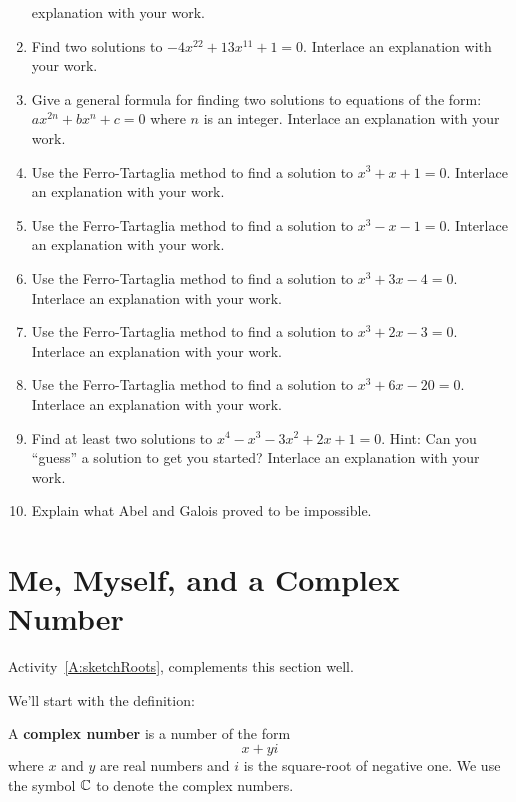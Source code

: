 \begin{problems}
\begin{enumerate}
  explanation with your work.
\item Find two solutions to $-4x^{22} + 13x^{11} + 1 = 0$. Interlace
  an explanation with your work.
\item Give a general formula for finding two solutions to equations of
  the form: $ax^{2n} + bx^{n} + c = 0$ where $n$ is an
  integer. Interlace an explanation with your work.
\item Use the Ferro-Tartaglia method to find a solution to $x^3+x+1 =
  0$. Interlace an explanation with your work.
\item Use the Ferro-Tartaglia method to find a solution to $x^3-x-1 =
  0$. Interlace an explanation with your work.
\item Use the Ferro-Tartaglia method to find a solution to $x^3+3x-4 =
  0$. Interlace an explanation with your work.
\item Use the Ferro-Tartaglia method to find a solution to $x^3+2x-3 =
  0$. Interlace an explanation with your work.
\item Use the Ferro-Tartaglia method to find a solution to $x^3+6x-20 =
  0$. Interlace an explanation with your work.
\item Find at least two solutions to $x^4-x^3-3x^2+2x+1 =0$. Hint: Can
  you ``guess'' a solution to get you started?  Interlace an
  explanation with your work.
\item Explain what Abel and Galois proved to be impossible.
\end{enumerate}
\end{problems}





\section{Me, Myself, and a Complex Number}

\begin{teachingnote}
Activity~\ref{A:sketchRoots}, complements this section well.
\end{teachingnote}


We'll start with the definition:

\begin{definition} 
A \textbf{complex number} is a
number of the form
\[
x + yi
\]
where $x$ and $y$ are real numbers and $i$ is the square-root of
negative one. We use the symbol $\mathbb C$ to denote the complex numbers.
\end{definition}

